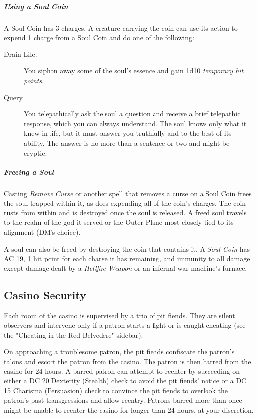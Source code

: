 \documentclass[10pt,a4paper,twoside,bg=print,twocolumn,openany,nodeprecatedcode]{dndbook}
\begin{document}
\subparagraph{Using a Soul Coin}
A Soul Coin has 3 charges. A creature carrying the coin can use its action to expend 1 charge from a Soul Coin and do one of the following:


\begin{description}
\item[Drain Life.]
You siphon away some of the soul's essence and gain 1d10 \textit{temporary hit points}.
\item[Query.]
You telepathically ask the soul a question and receive a brief telepathic response, which you can always understand. The soul knows only what it knew in life, but it must answer you truthfully and to the best of its ability. The answer is no more than a sentence or two and might be cryptic.
\end{description}

\subparagraph{Freeing a Soul}
Casting \textit{Remove Curse} or another spell that removes a curse on a Soul Coin frees the soul trapped within it, as does expending all of the coin's charges. The coin rusts from within and is destroyed once the soul is released. A freed soul travels to the realm of the god it served or the Outer Plane most closely tied to its alignment (DM's choice).

A soul can also be freed by destroying the coin that contains it. A \textit{Soul Coin} has AC 19, 1 hit point for each charge it has remaining, and immunity to all damage except damage dealt by a \textit{Hellfire Weapon} or an infernal war machine's furnace.

\subsection{Casino Security}
Each room of the casino is supervised by a trio of pit fiends. They are silent observers and intervene only if a patron starts a fight or is caught cheating (see the "Cheating in the Red Belvedere" sidebar).

On approaching a troublesome patron, the pit fiends confiscate the patron's talons and escort the patron from the casino. The patron is then barred from the casino for 24 hours. A barred patron can attempt to reenter by succeeding on either a DC 20 Dexterity (Stealth) check to avoid the pit fiends' notice or a DC 15 Charisma (Persuasion) check to convince the pit fiends to overlook the patron's past transgressions and allow reentry. Patrons barred more than once might be unable to reenter the casino for longer than 24 hours, at your discretion.
\end{document}
